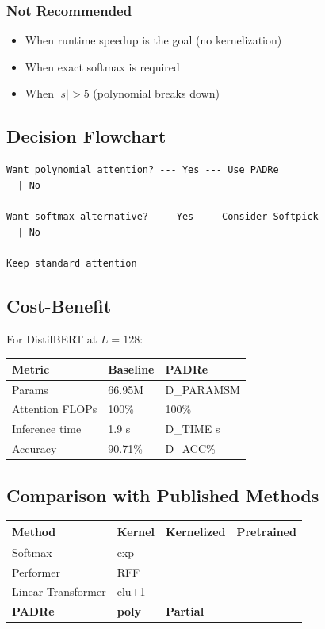\subsubsection{Not Recommended}
\begin{itemize}
\item When runtime speedup is the goal (no kernelization)
\item When exact softmax is required
\item When $|s| > 5$ (polynomial breaks down)

\end{itemize}
\subsection{Decision Flowchart}

\begin{lstlisting}
Want polynomial attention? --- Yes --- Use PADRe
  | No
   
Want softmax alternative? --- Yes --- Consider Softpick
  | No
   
Keep standard attention
\end{lstlisting}

\subsection{Cost-Benefit}

For DistilBERT at $L = 128$:

\begin{table}[H]
\centering
\small
\begin{tabular}{lll}
\toprule
\textbf{Metric} & \textbf{Baseline} & \textbf{PADRe} \\
\midrule
Params & 66.95M & {{D\_PARAMS}}M \\
Attention FLOPs & 100\% & 100\% \\
Inference time & 1.9 s & {{D\_TIME}} s \\
Accuracy & 90.71\% & {{D\_ACC}}\% \\
\bottomrule
\end{tabular}
\end{table}

\subsection{Comparison with Published Methods}

\begin{table}[H]
\centering
\small
\begin{tabular}{llll}
\toprule
\textbf{Method} & \textbf{Kernel} & \textbf{Kernelized} & \textbf{Pretrained} \\
\midrule
Softmax & exp &  & -- \\
Performer & RFF &  &  \\
Linear Transformer & elu+1 &  &  \\
\textbf{PADRe} & \textbf{poly} & \textbf{Partial} & \textbf{ } \\
\bottomrule
\end{tabular}
\end{table}

